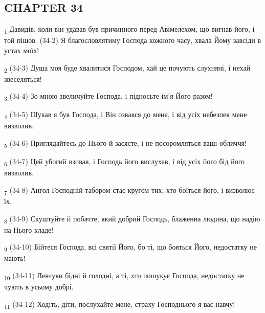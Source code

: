 \subsection{CHAPTER 34}
\begin{tcolorbox}
\textsubscript{1} Давидів, коли він удавав був причинного перед Авімелехом, що вигнав його, і той пішов. (34-2) Я благословлятиму Господа кожного часу, хвала Йому завсіди в устах моїх!
\end{tcolorbox}
\begin{tcolorbox}
\textsubscript{2} (34-3) Душа моя буде хвалитися Господом, хай це почують слухняні, і нехай звеселяться!
\end{tcolorbox}
\begin{tcolorbox}
\textsubscript{3} (34-4) Зо мною звеличуйте Господа, і підносьте ім'я Його разом!
\end{tcolorbox}
\begin{tcolorbox}
\textsubscript{4} (34-5) Шукав я був Господа, і Він озвався до мене, і від усіх небезпек мене визволив.
\end{tcolorbox}
\begin{tcolorbox}
\textsubscript{5} (34-6) Приглядайтесь до Нього й засяєте, і не посоромляться ваші обличчя!
\end{tcolorbox}
\begin{tcolorbox}
\textsubscript{6} (34-7) Цей убогий взивав, і Господь його вислухав, і від усіх його бід його визволив.
\end{tcolorbox}
\begin{tcolorbox}
\textsubscript{7} (34-8) Ангол Господній табором стає кругом тих, хто боїться його, і визволює їх.
\end{tcolorbox}
\begin{tcolorbox}
\textsubscript{8} (34-9) Скуштуйте й побачте, який добрий Господь, блаженна людина, що надію на Нього кладе!
\end{tcolorbox}
\begin{tcolorbox}
\textsubscript{9} (34-10) Бійтеся Господа, всі святії Його, бо ті, що бояться Його, недостатку не мають!
\end{tcolorbox}
\begin{tcolorbox}
\textsubscript{10} (34-11) Левчуки бідні й голодні, а ті, хто пошукує Господа, недостатку не чують в усьому добрі.
\end{tcolorbox}
\begin{tcolorbox}
\textsubscript{11} (34-12) Ходіть, діти, послухайте мене, страху Господнього я вас навчу!
\end{tcolorbox}
